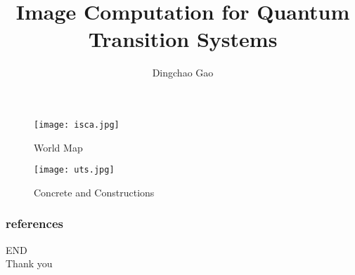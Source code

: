 \documentclass[aspectratio=1610]{beamer}
\title[TDD in quantum]{Image Computation for Quantum Transition Systems}
\author[Gcc]{Dingchao Gao}
\begin{document}
\begin{frame}[plain]
  \titlepage
  \begin{figure}[htbp]
    \centering
    \begin{minipage}[t]{0.48\textwidth}
    \centering
    \texttt{[image: isca.jpg]}
    \caption{World Map}
    \end{minipage}
    \begin{minipage}[t]{0.48\textwidth}
    \centering
    \texttt{[image: uts.jpg]}
    \caption{Concrete and Constructions}
    \end{minipage}
    \end{figure}
\end{frame}
\begin{frame}
	\frametitle{references}
	\printbibliography
\end{frame}
\begin{frame}
\centering
\Huge{END\\Thank you}
\end{frame}
\end{document}
